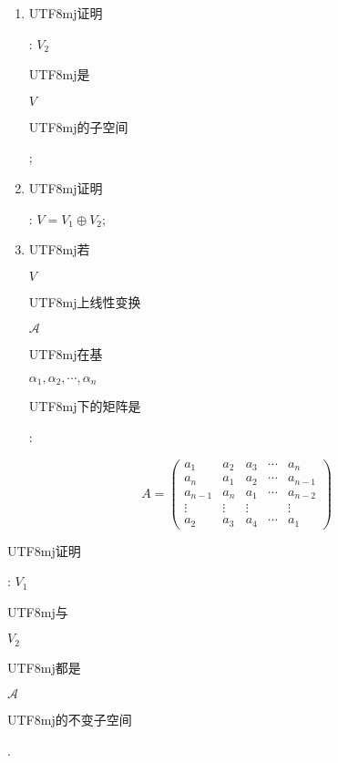 \documentclass[10pt]{article}
\begin{document}
\begin{enumerate}
  \item \begin{CJK}{UTF8}{mj}证明\end{CJK}: $V_{2}$ \begin{CJK}{UTF8}{mj}是\end{CJK} $V$ \begin{CJK}{UTF8}{mj}的子空间\end{CJK};

  \item \begin{CJK}{UTF8}{mj}证明\end{CJK}: $V=V_{1} \oplus V_{2}$;

  \item \begin{CJK}{UTF8}{mj}若\end{CJK} $V$ \begin{CJK}{UTF8}{mj}上线性变换\end{CJK} $\mathscr{A}$ \begin{CJK}{UTF8}{mj}在基\end{CJK} $\alpha_{1}, \alpha_{2}, \cdots, \alpha_{n}$ \begin{CJK}{UTF8}{mj}下的矩阵是\end{CJK}:

\end{enumerate}
$$
A=\left(\begin{array}{ccccc}
a_{1} & a_{2} & a_{3} & \cdots & a_{n} \\
a_{n} & a_{1} & a_{2} & \cdots & a_{n-1} \\
a_{n-1} & a_{n} & a_{1} & \cdots & a_{n-2} \\
\vdots & \vdots & \vdots & & \vdots \\
a_{2} & a_{3} & a_{4} & \cdots & a_{1}
\end{array}\right)
$$
\begin{CJK}{UTF8}{mj}证明\end{CJK}: $V_{1}$ \begin{CJK}{UTF8}{mj}与\end{CJK} $V_{2}$ \begin{CJK}{UTF8}{mj}都是\end{CJK} $\mathscr{A}$ \begin{CJK}{UTF8}{mj}的不变子空间\end{CJK}.
\end{document}
